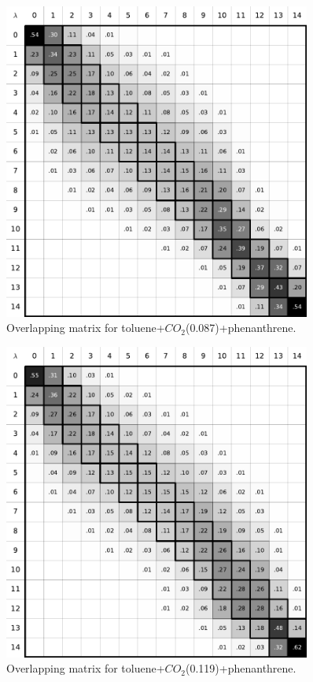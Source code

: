\documentclass[
	12pt,				%
	openany,			%
	oneside,			%
	a4paper,			%
	english,			%
	brazil				%
	]{abntex2}
\begin{document}
\begin{apendicesenv}
\begin{figure}[H]
	\centering
	\includegraphics[width=0.9\textwidth]{Figures/otolco2_1}
	\caption{Overlapping matrix for toluene+$CO_{2}$(0.087)+phenanthrene.}
\end{figure}
\begin{figure}[H]
	\centering
	\includegraphics[width=0.9\textwidth]{Figures/otolco2_2}
	\caption{Overlapping matrix for toluene+$CO_{2}$(0.119)+phenanthrene.}
\end{figure}


\end{apendicesenv}
\end{document}
